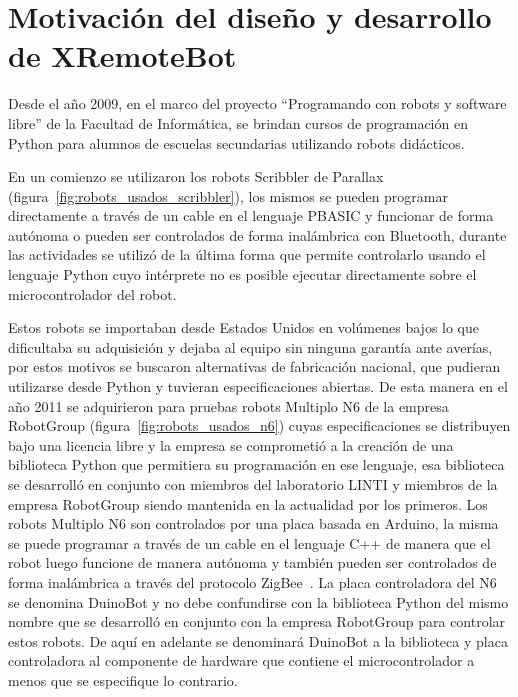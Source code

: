 \chapter{Motivación del diseño y desarrollo de XRemoteBot}\label{ch1}

Desde el año 2009, en el marco del proyecto ``Programando con robots y
software libre'' de la Facultad de Informática,
se brindan cursos de programación en Python para alumnos de escuelas
secundarias utilizando robots didácticos.

En un comienzo se utilizaron los robots Scribbler de Parallax
(figura~\ref{fig:robots_usados_scribbler}), los mismos se
pueden programar directamente a través de un cable en el lenguaje
PBASIC y funcionar de forma autónoma o pueden ser controlados de forma
inalámbrica con Bluetooth, durante las actividades se utilizó de la última
forma que permite controlarlo usando el lenguaje Python cuyo intérprete no
es posible ejecutar directamente sobre el microcontrolador del robot.

Estos robots se importaban desde Estados Unidos en volúmenes bajos lo que
dificultaba su adquisición y dejaba al equipo sin ninguna garantía ante
averías, por estos motivos se buscaron alternativas de fabricación nacional,
que pudieran utilizarse desde Python y tuvieran especificaciones abiertas.
De esta manera en el año 2011 se adquirieron para pruebas robots Multiplo N6
de la empresa RobotGroup (figura~\ref{fig:robots_usados_n6})
cuyas especificaciones se distribuyen bajo una licencia libre y
la empresa se comprometió a la creación de una biblioteca Python que permitiera
su programación en ese lenguaje, esa biblioteca se desarrolló en conjunto
con miembros del laboratorio LINTI y miembros de la empresa RobotGroup siendo
mantenida en la actualidad por los primeros. Los robots Multiplo N6 son
controlados por una placa basada en Arduino, la misma se puede programar
a través de un cable en el lenguaje C++ de manera que el robot luego funcione
de manera autónoma y también pueden ser controlados de forma inalámbrica
a través del protocolo ZigBee~\citep{diaz_aprendiendo_2012}. La placa
controladora del N6 se denomina DuinoBot y no debe confundirse con la biblioteca
Python del mismo nombre que se desarrolló en conjunto con la empresa RobotGroup
para controlar estos robots. De aquí en adelante se denominará DuinoBot a la
biblioteca y placa controladora al componente de hardware que contiene el
microcontrolador a menos que se especifique lo contrario.



